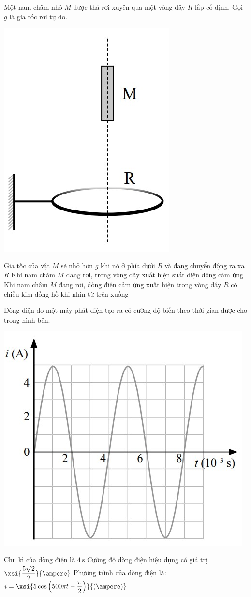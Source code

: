 \begin{ex}
	Một nam châm nhỏ $M$ được thả rơi xuyên qua một vòng dây $R$ lắp cố định. Gọi $g$ là gia tốc rơi tự do.
	\begin{center}
		\includegraphics[width=0.2\linewidth]{figs/VN12-Y24-PH-SYL-025P-12}
	\end{center}
	{\True Gia tốc của vật $M$ sẽ nhỏ hơn $g$ khi nó ở phía dưới $R$ và đang chuyển động ra xa $R$}
	{\True Khi nam châm $M$ đang rơi, trong vòng dây xuất hiện suất điện động cảm ứng}
	{Khi nam châm $M$ đang rơi, dòng điện cảm ứng xuất hiện trong vòng dây $R$ có chiều kim đồng hồ khi nhìn từ trên xuống}
	\loigiai{}
\end{ex}
\begin{ex}
	Dòng điện do một máy phát điện tạo ra có cường độ biến theo thời gian được cho trong hình bên.	
	\begin{center}
		\includegraphics[width=0.4\linewidth]{figs/VN12-Y24-PH-SYL-025P-13}
	\end{center}
	{Chu kì của dòng điện là $\SI{4}{\second}$}
	{\True Cường độ dòng điện hiệu dụng có giá trị $\xsi{\dfrac{5\sqrt{2}}{2}}{\ampere}$}
	{\True Phương trình của dòng điện là: $
		i=\xsi{5 \cos \left(500 \pi t-\dfrac{\pi}{2}\right)}{\left(\ampere\right)}$}
	\loigiai{}
\end{ex}

